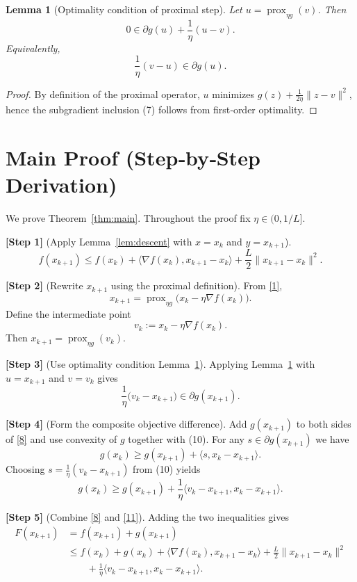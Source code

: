 \documentclass{article}
\newtheorem{lemma}{Lemma}
\newcommand{\prox}{\operatorname{prox}}
\newcommand{\grad}{\nabla}
\begin{document}
\begin{lemma}[Optimality condition of proximal step]\label{lem:prox-opt}
Let $u=\prox_{\eta g}(v)$. Then
\[
0\in\partial g(u)+\frac{1}{\eta}(u-v). \tag{7}
\]
Equivalently,
\[
\frac{1}{\eta}(v-u)\in\partial g(u). 
\]
\end{lemma}
\begin{proof}
By definition of the proximal operator, $u$ minimizes $g(z)+\frac{1}{2\eta}\|z-v\|^{2}$, hence the subgradient inclusion (7) follows from first‑order optimality. \qedhere
\end{proof}

\section*{Main Proof (Step‑by‑Step Derivation)}
We prove Theorem~\ref{thm:main}. Throughout the proof fix $\eta\in(0,1/L]$.

\noindent\textbf{[Step 1]} (Apply Lemma~\ref{lem:descent} with $x=x_{k}$ and $y=x_{k+1}$).  
\[
f(x_{k+1})\le f(x_{k})+\langle\grad f(x_{k}),x_{k+1}-x_{k}\rangle+\frac{L}{2}\|x_{k+1}-x_{k}\|^{2}. \tag{8}
\]

\noindent\textbf{[Step 2]} (Rewrite $x_{k+1}$ using the proximal definition).  
From \eqref{1},
\[
x_{k+1}= \prox_{\eta g}\!\big(x_{k}-\eta\grad f(x_{k})\big).
\]
Define the intermediate point
\[
v_{k}:=x_{k}-\eta\grad f(x_{k}). \tag{9}
\]
Then $x_{k+1}= \prox_{\eta g}(v_{k})$.

\noindent\textbf{[Step 3]} (Use optimality condition Lemma~\ref{lem:prox-opt}).  
Applying Lemma~\ref{lem:prox-opt} with $u=x_{k+1}$ and $v=v_{k}$ gives
\[
\frac{1}{\eta}\big(v_{k}-x_{k+1}\big)\in\partial g(x_{k+1}). \tag{10}
\]

\noindent\textbf{[Step 4]} (Form the composite objective difference).  
Add $g(x_{k+1})$ to both sides of \eqref{8} and use convexity of $g$ together with (10).  
For any $s\in\partial g(x_{k+1})$ we have
\[
g(x_{k})\ge g(x_{k+1})+\langle s, x_{k}-x_{k+1}\rangle.
\]
Choosing $s=\frac{1}{\eta}(v_{k}-x_{k+1})$ from (10) yields
\[
g(x_{k})\ge g(x_{k+1})+\frac{1}{\eta}\langle v_{k}-x_{k+1},x_{k}-x_{k+1}\rangle. \tag{11}
\]

\noindent\textbf{[Step 5]} (Combine \eqref{8} and \eqref{11}).  
Adding the two inequalities gives
\[
\begin{aligned}
F(x_{k+1})
&=f(x_{k+1})+g(x_{k+1})\\
&\le f(x_{k})+g(x_{k})
+\langle\grad f(x_{k}),x_{k+1}-x_{k}\rangle
+\frac{L}{2}\|x_{k+1}-x_{k}\|^{2}\\
&\qquad
+\frac{1}{\eta}\langle v_{k}-x_{k+1},x_{k}-x_{k+1}\rangle .
\end{aligned}
\tag{12}
\]
\end{document}
